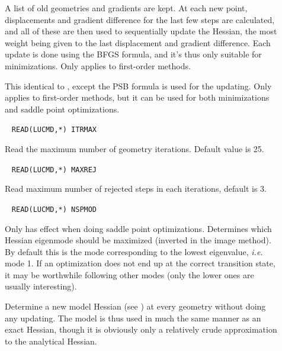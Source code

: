 \begin{description}
\item[]
A list of old geometries and gradients are kept. At each new point,
displacements and gradient difference for the last few steps are
calculated, and all of these are then used to sequentially update the
Hessian, the most weight being given to the last displacement and
gradient difference. Each update is done using the BFGS formula, and
it's thus only suitable for minimizations. Only applies to first-order
methods.

\item[]
This identical to , except the PSB formula is used for the
updating. Only applies to first-order methods, but it can be used for both minimizations and saddle
point optimizations.

\item[]\verb| |
\newline
\verb|READ(LUCMD,*) ITRMAX|

Read the maximum number of geometry iterations.
Default value is 25.

\item[]\verb| |
\newline
\verb|READ(LUCMD,*) MAXREJ|

Read maximum number of rejected steps
in each iterations, default is 3.

\item[]\verb| |
\newline
\verb|READ(LUCMD,*) NSPMOD|

Only has effect when doing saddle point optimizations.
Determines which Hessian eigenmode should be maximized (inverted in the image
method). By default this is the mode corresponding to the lowest
eigenvalue, {\it i.e.\/} mode 1. If an optimization does not end up at
the correct transition state, it may be worthwhile following other modes
(only the lower ones are usually interesting).

\item[]
Determine a new model Hessian (see )
at every geometry without doing any updating. The model is thus used
in much the same manner as an exact Hessian, though it is obviously
only a relatively crude approximation to the analytical Hessian.


\end{description}
